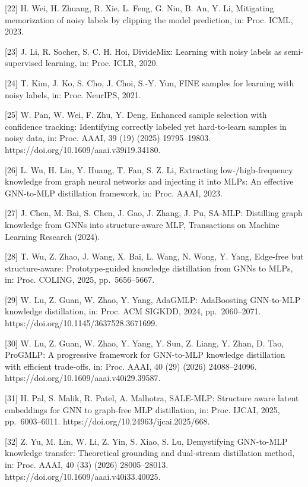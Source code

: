 {[}22{]} H. Wei, H. Zhuang, R. Xie, L. Feng, G. Niu, B. An, Y. Li, Mitigating memorization of noisy labels by clipping the model prediction, in: Proc. ICML, 2023.

{[}23{]} J. Li, R. Socher, S. C. H. Hoi, DivideMix: Learning with noisy labels as semi-supervised learning, in: Proc. ICLR, 2020.

{[}24{]} T. Kim, J. Ko, S. Cho, J. Choi, S.-Y. Yun, FINE samples for learning with noisy labels, in: Proc. NeurIPS, 2021.

{[}25{]} W. Pan, W. Wei, F. Zhu, Y. Deng, Enhanced sample selection with confidence tracking: Identifying correctly labeled yet hard-to-learn samples in noisy data, in: Proc. AAAI, 39 (19) (2025) 19795--19803. https://doi.org/10.1609/aaai.v39i19.34180.

{[}26{]} L. Wu, H. Lin, Y. Huang, T. Fan, S. Z. Li, Extracting low-/high-frequency knowledge from graph neural networks and injecting it into MLPs: An effective GNN-to-MLP distillation framework, in: Proc. AAAI, 2023.

{[}27{]} J. Chen, M. Bai, S. Chen, J. Gao, J. Zhang, J. Pu, SA-MLP: Distilling graph knowledge from GNNs into structure-aware MLP, Transactions on Machine Learning Research (2024).

{[}28{]} T. Wu, Z. Zhao, J. Wang, X. Bai, L. Wang, N. Wong, Y. Yang, Edge-free but structure-aware: Prototype-guided knowledge distillation from GNNs to MLPs, in: Proc. COLING, 2025, pp.~5656--5667.

{[}29{]} W. Lu, Z. Guan, W. Zhao, Y. Yang, AdaGMLP: AdaBoosting GNN-to-MLP knowledge distillation, in: Proc. ACM SIGKDD, 2024, pp.~2060--2071. https://doi.org/10.1145/3637528.3671699.

{[}30{]} W. Lu, Z. Guan, W. Zhao, Y. Yang, Y. Sun, Z. Liang, Y. Zhan, D. Tao, ProGMLP: A progressive framework for GNN-to-MLP knowledge distillation with efficient trade-offs, in: Proc. AAAI, 40 (29) (2026) 24088--24096. https://doi.org/10.1609/aaai.v40i29.39587.

{[}31{]} H. Pal, S. Malik, R. Patel, A. Malhotra, SALE-MLP: Structure aware latent embeddings for GNN to graph-free MLP distillation, in: Proc. IJCAI, 2025, pp.~6003--6011. https://doi.org/10.24963/ijcai.2025/668.

{[}32{]} Z. Yu, M. Lin, W. Li, Z. Yin, S. Xiao, S. Lu, Demystifying GNN-to-MLP knowledge transfer: Theoretical grounding and dual-stream distillation method, in: Proc. AAAI, 40 (33) (2026) 28005--28013. https://doi.org/10.1609/aaai.v40i33.40025.

